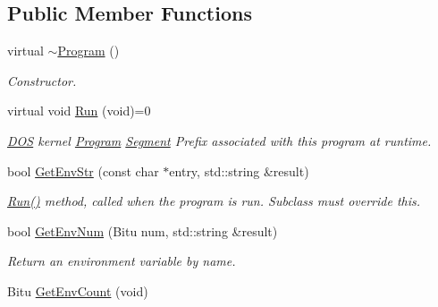 \subsection*{Public Member Functions}
\begin{DoxyCompactItemize}
\item 
virtual \hyperlink{classProgram_a2df844d46504a414498c2140de94bfef}{$\sim$\-Program} ()
\begin{DoxyCompactList}\small\item\em Constructor. \end{DoxyCompactList}\item 
\hypertarget{classProgram_acd37c94c3c12a55650a05ee1449aa176}{virtual void \hyperlink{classProgram_acd37c94c3c12a55650a05ee1449aa176}{Run} (void)=0}\label{classProgram_acd37c94c3c12a55650a05ee1449aa176}

\begin{DoxyCompactList}\small\item\em \hyperlink{classDOS}{D\-O\-S} kernel \hyperlink{classProgram}{Program} \hyperlink{structSegment}{Segment} Prefix associated with this program at runtime. \end{DoxyCompactList}\item 
\hypertarget{classProgram_a0012adb877f24b04d836a37ab48f2c60}{bool \hyperlink{classProgram_a0012adb877f24b04d836a37ab48f2c60}{Get\-Env\-Str} (const char $\ast$entry, std\-::string \&result)}\label{classProgram_a0012adb877f24b04d836a37ab48f2c60}

\begin{DoxyCompactList}\small\item\em \hyperlink{classProgram_acd37c94c3c12a55650a05ee1449aa176}{Run()} method, called when the program is run. Subclass must override this. \end{DoxyCompactList}\item 
\hypertarget{classProgram_a58d316ec88ff44eff5188f46ef7eefd8}{bool \hyperlink{classProgram_a58d316ec88ff44eff5188f46ef7eefd8}{Get\-Env\-Num} (Bitu num, std\-::string \&result)}\label{classProgram_a58d316ec88ff44eff5188f46ef7eefd8}

\begin{DoxyCompactList}\small\item\em Return an environment variable by name. \end{DoxyCompactList}\item 
\hypertarget{classProgram_a67b647d573493de3f7237fe075a8532d}{Bitu \hyperlink{classProgram_a67b647d573493de3f7237fe075a8532d}{Get\-Env\-Count} (void)}\label{classProgram_a67b647d573493de3f7237fe075a8532d}


\end{DoxyCompactItemize}
